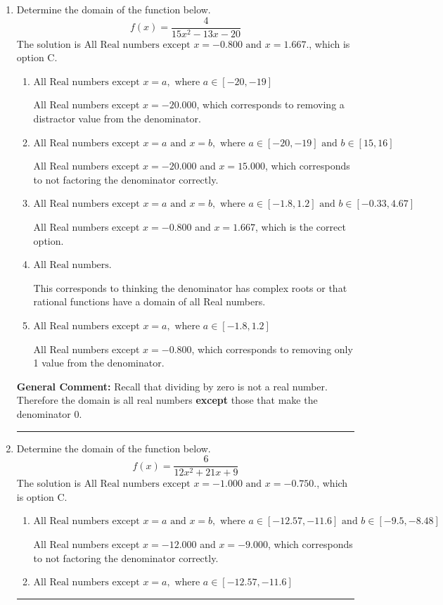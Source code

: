 \documentclass{extbook}[14pt]
\newcommand{\litem}[1]{\item #1

\rule{\textwidth}{0.4pt}}
\begin{document}
\begin{enumerate}\litem{
Determine the domain of the function below.
\[ f(x) = \frac{4}{15x^{2} -13 x -20} \]The solution is \( \text{All Real numbers except } x = -0.800 \text{ and } x = 1.667. \), which is option C.\begin{enumerate}[label=\Alph*.]
\item \( \text{All Real numbers except } x = a, \text{ where } a \in [-20, -19] \)

All Real numbers except $x = -20.000$, which corresponds to removing a distractor value from the denominator.
\item \( \text{All Real numbers except } x = a \text{ and } x = b, \text{ where } a \in [-20, -19] \text{ and } b \in [15, 16] \)

All Real numbers except $x = -20.000$ and $x = 15.000$, which corresponds to not factoring the denominator correctly.
\item \( \text{All Real numbers except } x = a \text{ and } x = b, \text{ where } a \in [-1.8, 1.2] \text{ and } b \in [-0.33, 4.67] \)

All Real numbers except $x = -0.800$ and $x = 1.667$, which is the correct option.
\item \( \text{All Real numbers.} \)

This corresponds to thinking the denominator has complex roots or that rational functions have a domain of all Real numbers.
\item \( \text{All Real numbers except } x = a, \text{ where } a \in [-1.8, 1.2] \)

All Real numbers except $x = -0.800$, which corresponds to removing only 1 value from the denominator.
\end{enumerate}

\textbf{General Comment:} Recall that dividing by zero is not a real number. Therefore the domain is all real numbers \textbf{except} those that make the denominator 0.
}
\litem{
Determine the domain of the function below.
\[ f(x) = \frac{6}{12x^{2} +21 x + 9} \]The solution is \( \text{All Real numbers except } x = -1.000 \text{ and } x = -0.750. \), which is option C.\begin{enumerate}[label=\Alph*.]
\item \( \text{All Real numbers except } x = a \text{ and } x = b, \text{ where } a \in [-12.57, -11.6] \text{ and } b \in [-9.5, -8.48] \)

All Real numbers except $x = -12.000$ and $x = -9.000$, which corresponds to not factoring the denominator correctly.
\item \( \text{All Real numbers except } x = a, \text{ where } a \in [-12.57, -11.6] \)


\end{enumerate}}
\end{enumerate}
\end{document}

